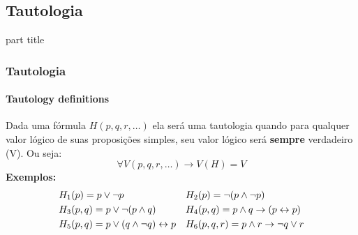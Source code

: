 \subsection{Tautologia}
%
\begin{frame}[c]
    \begin{beamercolorbox}[rounded=true,shadow=true,sep=12pt,center]{part title}
        \insertsection\par
    \end{beamercolorbox}
\end{frame}
%
\begin{frame}[t]
    \frametitle{Tautologia}
    \framesubtitle{Tautology definitions}
    \begin{tcolorbox}[colback=red!5!white,colframe=red!75!black,title=Definição]
        Dada uma fórmula $H(p,q,r,\dots)$ ela será uma tautologia quando para qualquer valor lógico de suas proposições simples, seu valor lógico será \textbf{sempre} verdadeiro (V). Ou seja:
        $$ \forall V(p,q,r,\dots) \to V(H)=V$$
        \tcblower
        \textbf{Exemplos:}
        \begin{align*}
            &H_1(p)   = p \lor \lnot p                  &        & H_2(p) = \lnot (p \land \lnot p) \\
            &H_3(p,q) = p \lor \lnot (p \land q)           &        & H_4(p,q) = p \land q \rightarrow (p \leftrightarrow p) \\
            &H_5(p,q) = p \lor (q \land \lnot q) \leftrightarrow p     &        & H_6(p,q,r) = p \land r \rightarrow \lnot q \lor r
        \end{align*}
    \end{tcolorbox}
\end{frame}
%
